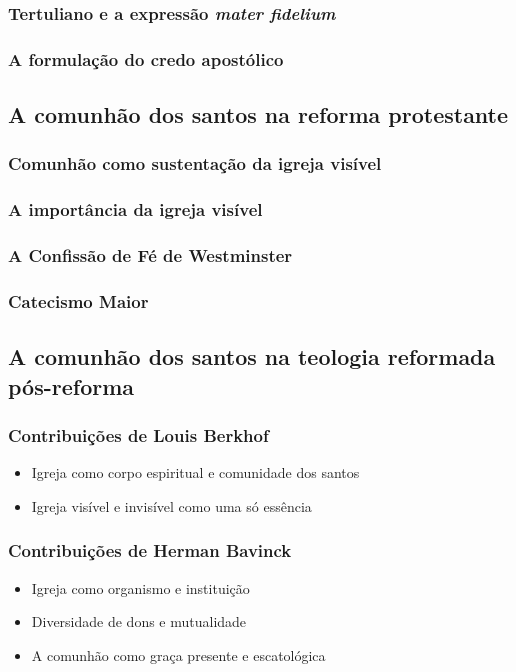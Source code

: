 \subsubsection{Tertuliano e a expressão \textit{mater fidelium}}
\subsubsection{A formulação do credo apostólico}

\subsection{A comunhão dos santos na reforma protestante}
\subsubsection{Comunhão como sustentação da igreja visível}
\subsubsection{A importância da igreja visível}
\subsubsection{A Confissão de Fé de Westminster}
\subsubsection{Catecismo Maior}

\subsection{A comunhão dos santos na teologia reformada pós-reforma}
\subsubsection{Contribuições de Louis Berkhof}
\begin{itemize}
  \item Igreja como corpo espiritual e comunidade dos santos
  \item Igreja visível e invisível como uma só essência
\end{itemize}

\subsubsection{Contribuições de Herman Bavinck}
\begin{itemize}
  \item Igreja como organismo e instituição
  \item Diversidade de dons e mutualidade
  \item A comunhão como graça presente e escatológica
\end{itemize}

